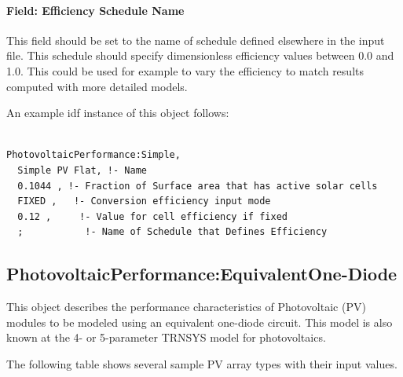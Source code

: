 \paragraph{Field: Efficiency Schedule Name}\label{field-efficiency-schedule-name}

This field should be set to the name of schedule defined elsewhere in the input file. This schedule should specify dimensionless efficiency values between 0.0 and 1.0. This could be used for example to vary the efficiency to match results computed with more detailed models.

An example idf instance of this object follows:

\begin{lstlisting}

PhotovoltaicPerformance:Simple,
  Simple PV Flat, !- Name
  0.1044 , !- Fraction of Surface area that has active solar cells
  FIXED ,   !- Conversion efficiency input mode
  0.12 ,     !- Value for cell efficiency if fixed
  ;           !- Name of Schedule that Defines Efficiency
\end{lstlisting}

\subsection{PhotovoltaicPerformance:EquivalentOne-Diode}\label{photovoltaicperformanceequivalentone-diode}

This object describes the performance characteristics of Photovoltaic (PV) modules to be modeled using an equivalent one-diode circuit. This model is also known at the 4- or 5-parameter TRNSYS model for photovoltaics.

The following table shows several sample PV array types with their input values.

